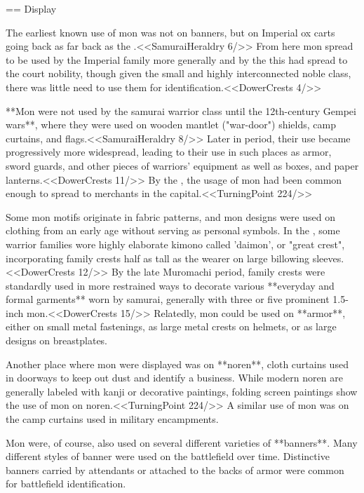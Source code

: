   == Display

  The earliest known use of mon was not on banners, but on Imperial ox
  carts going back as far back as the \NaraPeriod.<<SamuraiHeraldry
  6/>> From here mon spread to be used by the Imperial family more generally
  and by the \HeianPeriod this had spread to the court nobility, 
  though given the small and
  highly interconnected noble class, there was little need to use them
  for identification.<<DowerCrests 4/>>

  **Mon were not used by the samurai warrior class until the
  12th-century Gempei wars**, where they were used on wooden mantlet
  ("war-door") shields, camp curtains, and flags.<<SamuraiHeraldry
  8/>> Later in period, their use became progressively more
  widespread, leading to their use in such places as armor, sword guards,
  and other pieces of
  warriors' equipment as well as boxes, and paper lanterns.<<DowerCrests 11/>>
  By the \MomoyamaPeriod, the usage of mon had been common enough to
  spread to merchants in the capital.<<TurningPoint 224/>>

  Some mon motifs
  originate in fabric patterns, and mon designs were used on
  clothing from an early age without serving as personal symbols.  In the \MuromachiPeriod, some warrior
  families wore highly elaborate kimono called 'daimon', or
  "great crest", incorporating family crests half as tall as the
  wearer on large billowing sleeves.<<DowerCrests 12/>> By the late
  Muromachi period, family crests were standardly used in more
  restrained ways to decorate various **everyday and formal garments**
  worn by samurai, generally with three or five prominent 1.5-inch
  mon.<<DowerCrests 15/>>  Relatedly, mon could be used on **armor**,
  either on small metal fastenings, as large metal crests on helmets,
  or as large designs on breastplates.

  Another place where mon were displayed was on **noren**, cloth curtains used 
  in doorways to keep out dust and identify a business.  While modern 
  noren are generally labeled with kanji or decorative paintings, 
  \MomoyamaPeriod folding screen paintings show the use of 
  mon on noren.<<TurningPoint 224/>>  A similar use of mon was on
  the camp curtains used in military encampments.

  Mon were, of course, also used on several different varieties of
  **banners**.  Many different styles of banner were used on the
  battlefield over time. Distinctive banners carried by attendants or
  attached to the backs of armor were common for battlefield
  identification.

